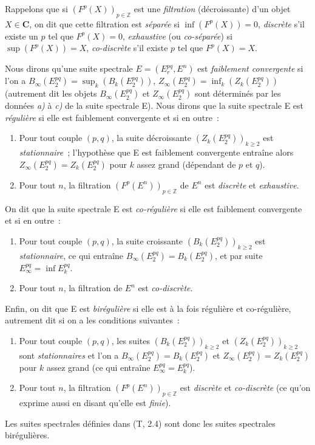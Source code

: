 \begin{env}[11.1.3]
\label{0.11.1.3-fr}
Rappelons que si $(F^p(X))_{p\in\mathbb Z}$ est une \emph{filtration} (décroissante)
d'un objet $X\in\boldsymbol{C}$, on dit que cette filtration est \emph{séparée}
si $\inf(F^p(X))=0$, \emph{discrète} s'il existe un $p$ tel que $F^p(X)=0$,
\emph{exhaustive} (ou \emph{co-séparée}) si $\sup(F^p(X))=X$,
\emph{co-discrète} s'il existe $p$ tel que $F^p(X)=X$.

Nous dirons qu'une suite spectrale $E=(E_r^{pq},E^n)$ est \emph{faiblement
convergente} si l'on a
$B_\infty(E_2^{pq})=\sup_k(B_k(E_2^{pq}))$,
$Z_\infty(E_2^{pq})=\inf_k(Z_k(E_2^{pq}))$
(autrement dit les objets $B_\infty(E_2^{pq})$ et $Z_\infty(E_2^{pq})$
sont déterminés par les données \emph{a)} à \emph{c)} de la suite spectrale E). Nous dirons
que la suite spectrale E est \emph{régulière} si elle est faiblement
convergente et si en outre~:
\begin{enumerate}
  \item[$1^\circ$] Pour tout couple $(p,q)$, la suite décroissante
    $(Z_k(E_2^{pq}))_{k\geq2}$ est \emph{stationnaire}~; l'hypothèse que E
    est faiblement convergente entraîne alors
    $Z_\infty(E_2^{pq})=Z_k(E_2^{pq})$ pour $k$ assez grand (dépendant de
    $p$ et $q$).
  \item[$2^\circ$] Pour tout $n$, la filtration
    $(F^p(E^n))_{p\in\mathbb Z}$ de $E^n$ est \emph{discrète} et
    \emph{exhaustive}.
\end{enumerate}

On dit que la suite spectrale E est \emph{co-régulière} si elle est
faiblement convergente et si en outre~:
\begin{enumerate}
  \item[$3^\circ$] Pour tout couple $(p,q)$, la suite croissante
    $(B_k(E_2^{pq}))_{k\geq2}$ est \emph{stationnaire}, ce qui entraîne
    $B_\infty(E_2^{pq})=B_k(E_2^{pq})$, et par suite
    $E_\infty^{pq}=\inf E_k^{pq}$.
  \item[$4^\circ$] Pour tout $n$, la filtration de $E^n$ est
    \emph{co-discrète}.
\end{enumerate}

Enfin, on dit que E est \emph{birégulière} si elle est à la fois régulière
et co-régulière, autrement dit si on a les conditions suivantes~:
\begin{enumerate}
  \item[\textit{a)}] Pour tout couple $(p,q)$, les suites
    $(B_k(E_2^{pq}))_{k\geq2}$ et $(Z_k(E_2^{pq}))_{k\geq2}$ sont
    \emph{stationnaires} et l'on a
    $B_\infty(E_2^{pq})=B_k(E_2^{pq})$ et
    $Z_\infty(E_2^{pq})=Z_k(E_2^{pq})$ pour $k$ assez grand (ce qui entraîne
    $E_\infty^{pq}=E_k^{pq}$).
  \item[\textit{b)}] Pour tout $n$, la filtration $(F^p(E^n))_{p\in\mathbb Z}$ est
    \emph{discrète} et \emph{co-discrète} (ce qu'on exprime aussi en disant
    qu'elle est \emph{finie}).
\end{enumerate}

Les suites spectrales définies dans (T, 2.4) sont donc les suites spectrales
birégulières.
\end{env}

